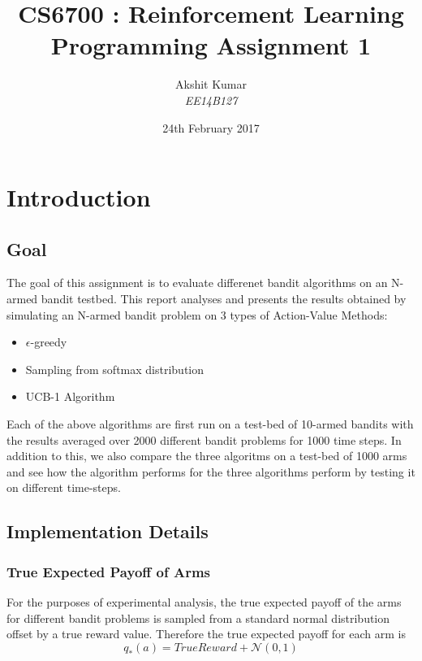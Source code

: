 \documentclass[english]{article}
\begin{document}
\title{\textbf{CS6700 : Reinforcement Learning } \\ Programming Assignment 1 }

\author{Akshit Kumar \\ \emph{EE14B127}}

\date{24th February 2017}

\maketitle
\tableofcontents{}

\section{Introduction}

\subsection{Goal}

The goal of this assignment is to evaluate differenet bandit algorithms on an N-armed bandit testbed. This report analyses and presents the results obtained by simulating an N-armed bandit problem on 3 types of Action-Value Methods:
\begin{itemize}
	\item $\epsilon$-greedy 
	\item Sampling from softmax distribution
	\item UCB-1 Algorithm
\end{itemize}
Each of the above algorithms are first run on a test-bed of 10-armed bandits with the results averaged over 2000 different bandit problems for 1000 time steps. In addition to this, we also compare the three algoritms on a test-bed of 1000 arms and see how the algorithm performs for the three algorithms perform by testing it on different time-steps.


\subsection{Implementation Details}
\subsubsection{True Expected Payoff of Arms}
For the purposes of experimental analysis, the true expected payoff of the arms for different bandit problems is sampled from a standard normal distribution offset by a true reward value. Therefore the true expected payoff for each arm is 
$$ q_{*}(a) = True Reward + \mathcal{N}(0,1)$$
\end{document}
